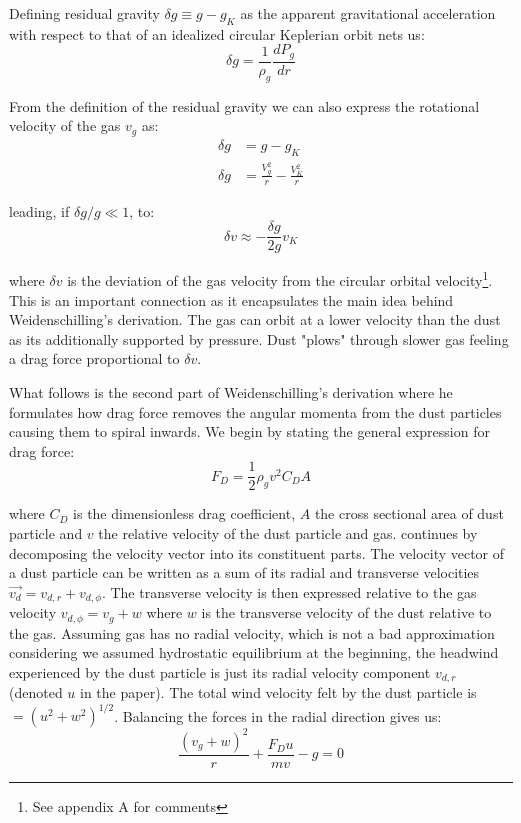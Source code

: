 \documentclass[12pt]{article}
\begin{document}
Defining residual gravity $\delta g \equiv g-g_K$ as the apparent gravitational acceleration with respect to that of an idealized circular Keplerian orbit nets us:
\begin{equation}
    \delta g = \frac{1}{\rho_g}\frac{dP_g}{dr}
\end{equation}

From the definition of the residual gravity we can also express the rotational velocity of the gas $v_g$ as:
\begin{align}
    \delta g &= g - g_K \\
    \delta g &= \frac{V^2_g}{r} - \frac{V^2_K}{r}
\end{align}

\noindent leading, if $\delta g / g \ll 1$, to:
\begin{equation}
    \label{eq:dvdg}
    \delta v \approx - \frac{\delta g}{2 g}v_K
\end{equation}

\noindent where $\delta v$ is the deviation of the gas velocity from the circular orbital velocity\footnote{See appendix A for comments}. This is an important connection as it encapsulates the main idea behind Weidenschilling's derivation. The gas can orbit at a lower velocity than the dust as its additionally supported by pressure. Dust "plows" through slower gas feeling a drag force proportional to $\delta v$. 

What follows is the second part of Weidenschilling's derivation where he formulates how drag force removes the angular momenta from the dust particles causing them to spiral inwards. We begin by stating the general expression for drag force: 
\begin{equation}
    F_D = \frac{1}{2} \rho_g v^2 C_D A  
\end{equation}

\noindent where $C_D$ is the dimensionless drag coefficient, $A$ the cross sectional area of dust particle and $v$ the relative velocity of the dust particle and gas. \citet{Weidenschilling77} continues  by decomposing the velocity vector into its constituent parts. The velocity vector of a dust particle can be written as a sum of its radial and transverse velocities $\vec{v_d} = v_{d, r} + v_{d, \phi}$. The transverse velocity is then expressed relative to the gas velocity $v_{d, \phi} = v_g + w$ where $w$ is the transverse velocity of the dust relative to the gas. Assuming gas has no radial velocity, which is not a bad approximation considering we assumed hydrostatic equilibrium at the beginning, the headwind experienced by the dust particle is just its radial velocity component $v_{d, r}$ (denoted $u$ in the paper). The total wind velocity felt by the dust particle is $= (u^2+w^2)^{1/2}$. Balancing the forces in the radial direction gives us:
\begin{equation}
    \label{eq:forceeq1}
    \frac{(v_g + w)^2}{r} + \frac{F_D u}{mv} - g = 0
\end{equation}
\end{document}
